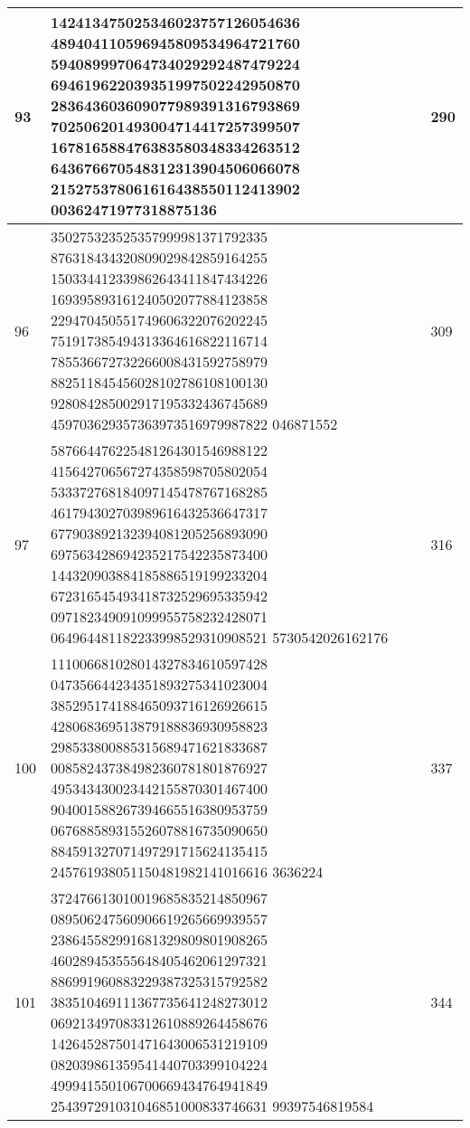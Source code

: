 \documentclass[12pt,conference]{IEEEtran}
\begin{document}
\begin{center}
\begin{tabular}{ |p{1.1cm} | p{5.3cm} | p{1.1cm}|}
  \hline
93 & 142413475025346023757126054636 489404110596945809534964721760 594089997064734029292487479224 694619622039351997502242950870 283643603609077989391316793869 702506201493004714417257399507 167816588476383580348334263512 643676670548312313904506066078 215275378061616438550112413902 00362471977318875136 & 290 \\ \hline 
96 & 350275323525357999981371792335 876318434320809029842859164255 150334412339862643411847434226 169395893161240502077884123858 229470450551749606322076202245 751917385494313364616822116714 785536672732266008431592758979 882511845456028102786108100130 928084285002917195332436745689 459703629357363973516979987822 046871552 & 309 \\ \hline 
97 & 587664476225481264301546988122 415642706567274358598705802054 533372768184097145478767168285 461794302703989616432536647317 677903892132394081205256893090 697563428694235217542235873400 144320903884185886519199233204 672316545493418732529695335942 097182349091099955758232428071 064964481182233998529310908521 5730542026162176 & 316 \\ \hline 
100 & 111006681028014327834610597428 047356644234351893275341023004 385295174188465093716126926615 428068369513879188836930958823 298533800885315689471621833687 008582437384982360781801876927 495343430023442155870301467400 904001588267394665516380953759 067688589315526078816735090650 884591327071497291715624135415 245761938051150481982141016616 3636224 & 337 \\ \hline 
101 & 372476613010019685835214850967 089506247560906619265669939557 238645582991681329809801908265 460289453555648405462061297321 886991960883229387325315792582 383510469111367735641248273012 069213497083312610889264458676 142645287501471643006531219109 082039861359541440703399104224 499941550106700669434764941849 254397291031046851000833746631 99397546819584 & 344 \\ \hline 

\end{tabular}


\end{center}
\end{document}
